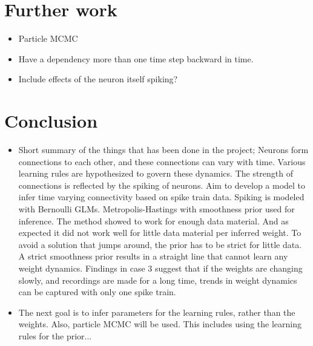 \section{Further work}
\begin{itemize}
    \item Particle MCMC
    \item Have a dependency more than one time step backward in time. 
    \item Include effects of the neuron itself spiking?
    
\end{itemize}

\section{Conclusion}

\begin{itemize}
    \item Short summary of the things that has been done in the project; Neurons form connections to each other, and these connections can vary with time. Various learning rules are hypothesized to govern these dynamics. The strength of connections is reflected by the spiking of neurons. Aim to develop a model to infer time varying connectivity based on spike train data. Spiking is modeled with Bernoulli GLMs. Metropolis-Hastings with smoothness prior used for inference. The method showed to work for enough data material. And as expected it did not work well for little data material per inferred weight. To avoid a solution that jumps around, the prior has to be strict for little data. A strict smoothness prior results in a straight line that cannot learn any weight dynamics. Findings in case 3 suggest that if the weights are changing slowly, and recordings are made for a long time, trends in weight dynamics can be captured with only one spike train.
    \item The next goal is to infer parameters for the learning rules, rather than the weights. Also, particle MCMC will be used. This includes using the learning rules for the prior... 
\end{itemize}



\cleardoublepage